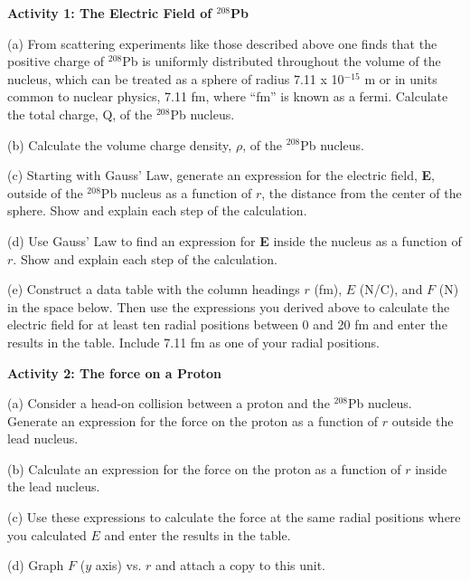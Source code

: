 \textbf{Activity 1: The Electric Field of \( ^{208} \)Pb}

(a) From scattering experiments like those described above one finds
that the positive charge of \( ^{208} \)Pb is uniformly distributed
throughout the volume of the nucleus, which can be treated as a sphere
of radius 7.11 x 10\( ^{-15} \) m or in units common to nuclear physics,
7.11 fm, where {}``fm'' is known as a fermi. Calculate the total
charge, Q, of the \( ^{208} \)Pb nucleus.
\vspace{30mm}

(b) Calculate the volume charge density, \( \rho  \), of the \( ^{208} \)Pb
nucleus.
\vspace{30mm}

(c) Starting with Gauss' Law, generate an expression for the electric
field, \textbf{E}, outside of the \( ^{208} \)Pb nucleus as a function
of $r$, the distance from the center of the sphere. Show and explain
each step of the calculation.
\vspace{2in}

(d) Use Gauss' Law to find an expression for \textbf{E} inside the
nucleus as a function of $r$. Show and explain each step of the calculation.
\vspace{2in}

(e) Construct a data table with the column headings $r$ (fm), $E$ (N/C),
and $F$ (N) in the space below. Then use the expressions you derived
above to calculate the electric field for at least ten radial positions
between 0 and 20 fm and enter the results in the table. Include 7.11
fm as one of your radial positions.
\vspace{3in}

\textbf{Activity 2: The force on a Proton}

(a) Consider a head-on collision between a proton and the \( ^{208} \)Pb
nucleus. Generate an expression for the force on the proton as a function
of $r$ outside the lead nucleus.
\vspace{20mm}

\vspace{1in}
(b) Calculate an expression for the force on the proton as a function
of $r$ inside the lead nucleus.
\vspace{30mm}

(c) Use these expressions to calculate the force at the same radial
positions where you calculated $E$ and enter the results in the table.

(d) Graph $F$ ($y$ axis) vs. $r$ and attach a copy to this unit.
\vspace{10mm}

